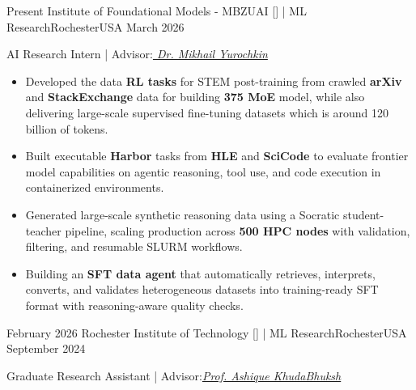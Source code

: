 %
%
%

\begin{experiences}

    \experience
    {Present}   {Institute of Foundational Models - MBZUAI [\href{https://ifm.ai/}{\textcolor{basecolor}{\faGlobe}}] | ML Research}{Rochester}{USA}
    {March 2026}
                    {
                    AI Research Intern | Advisor:\textit{\href{https://moonfolk.github.io/}{\textcolor{basecolor}{ Dr. Mikhail Yurochkin }}}
                      \begin{itemize}
                        \item Developed the data \textbf{RL tasks} for STEM post-training from crawled \textbf{arXiv} and \textbf{StackExchange} data for building \textbf{375 MoE} model, while also delivering large-scale supervised fine-tuning datasets which is around 120 billion of tokens.
                        \item Built executable \textbf{Harbor} tasks from \textbf{HLE} and \textbf{SciCode} to evaluate frontier model capabilities on agentic reasoning, tool use, and code execution in containerized environments.
                        \item Generated large-scale synthetic reasoning data using a Socratic student-teacher pipeline, scaling production across \textbf{500 HPC nodes} with validation, filtering, and resumable SLURM workflows.
                        \item Building an \textbf{SFT data agent} that automatically retrieves, interprets, converts, and validates heterogeneous datasets into training-ready SFT format with reasoning-aware quality checks.
                      \end{itemize}
                    }{}
  \emptySeparator
  \experience
    {February 2026}   {Rochester Institute of Technology [\href{https://www.rit.edu/}{\textcolor{basecolor}{\faGlobe}}] | ML Research}{Rochester}{USA}
    {September 2024}
                    {
                    Graduate Research Assistant | Advisor:\textit{\href{https://www.cs.cmu.edu/~akhudabu/}{\textcolor{basecolor}{Prof. Ashique KhudaBhuksh}}}
                      \begin{itemize}

\end{itemize}}
\end{experiences}
